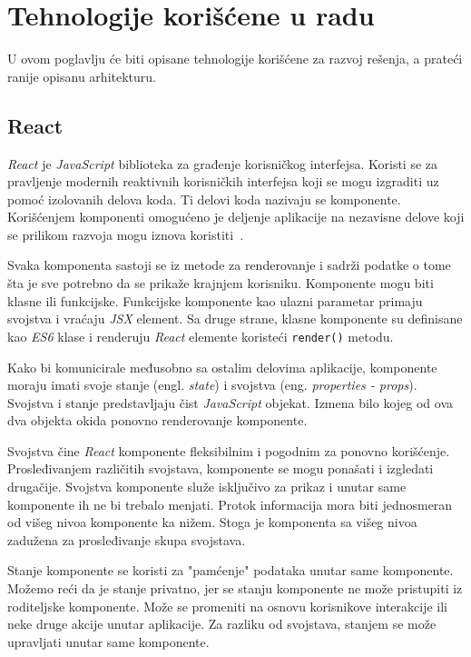 \section{Tehnologije korišćene u radu}\label{ch:tehnologije}

U ovom poglavlju će biti opisane tehnologije korišćene za razvoj rešenja, a prateći ranije opisanu arhitekturu.

\subsection{React}\label{sec:react}
\textit{React} je \textit{JavaScript} biblioteka za građenje korisničkog interfejsa. Koristi se za pravljenje modernih 
reaktivnih korisničkih interfejsa koji se mogu izgraditi uz pomoć izolovanih delova koda. Ti delovi koda nazivaju 
se komponente. Korišćenjem komponenti omogućeno je deljenje aplikacije na nezavisne delove koji se prilikom razvoja 
mogu iznova koristiti~\cite{react}.

Svaka komponenta sastoji se iz metode za renderovanje i sadrži podatke o tome šta je sve potrebno da se prikaže 
krajnjem korisniku. Komponente mogu biti klasne ili funkcijske. Funkcijske komponente kao ulazni parametar primaju svojstva 
i vraćaju \textit{JSX} element. Sa druge strane, klasne komponente su definisane kao \textit{ES6} 
klase i renderuju \textit{React} elemente koristeći \texttt{render()} metodu. 

Kako bi komunicirale međusobno sa ostalim delovima aplikacije, komponente moraju imati svoje stanje (engl. \textit{state}) 
i svojstva (eng. \textit{properties - props}). Svojstva i stanje predstavljaju čist \textit{JavaScript} objekat. Izmena bilo kojeg 
od ova dva objekta okida ponovno renderovanje komponente. 

Svojstva čine \textit{React} komponente fleksibilnim i pogodnim za 
ponovno korišćenje. Prosleđivanjem različitih svojstava, komponente se mogu ponašati i izgledati drugačije. Svojstva komponente 
služe isključivo za prikaz i unutar same komponente ih ne bi trebalo menjati. Protok informacija mora biti jednosmeran od višeg 
nivoa komponente ka nižem. Stoga je komponenta sa višeg nivoa zadužena za prosleđivanje skupa svojstava.

Stanje komponente se koristi za "pamćenje" podataka unutar same komponente. Možemo reći da je stanje privatno, jer se stanju 
komponente ne može pristupiti iz roditeljske komponente. Može se promeniti na osnovu korisnikove interakcije ili neke druge 
akcije unutar aplikacije. Za razliku od svojstava, stanjem se može upravljati unutar same komponente.

